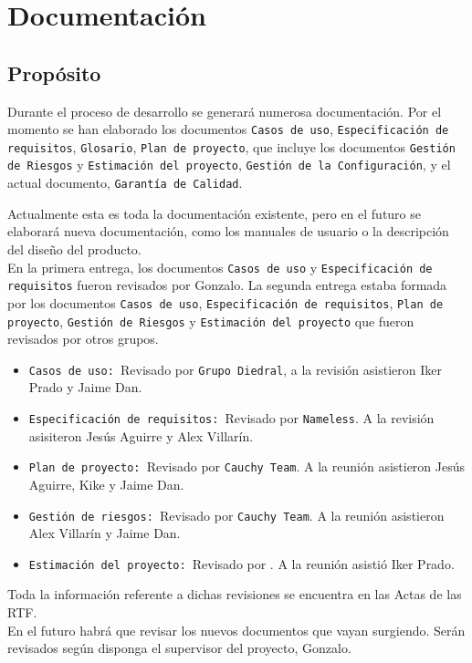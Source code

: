 \documentclass[spanish,a4paper,11pt, twoside]{report}	%
\begin{document}
\newpage
\mbox{}
\thispagestyle{empty}						%
\newpage

\chapter{ Documentación}%
	
	
	\section{Propósito}
			Durante el proceso de desarrollo se generará numerosa documentación.
		Por el momento se han elaborado los documentos \texttt{Casos de uso}, \texttt{Especificación de requisitos}, \texttt{Glosario}, \texttt{Plan de proyecto}, 
		que incluye los documentos \texttt{Gestión de Riesgos} y \texttt{Estimación del proyecto}, \texttt{Gestión de la Configuración}, 
		y el actual documento, \texttt{Garantía de Calidad}.

		Actualmente esta es toda la documentación existente, pero en el futuro se elaborará nueva documentación, 
		como los manuales de usuario o la descripción del diseño del producto.\\
			En la primera entrega, los documentos \texttt{Casos de uso} y \texttt{Especificación de requisitos} fueron revisados por Gonzalo. 
		La segunda entrega estaba formada por los documentos \texttt{Casos de uso}, \texttt{Especificación de requisitos}, \texttt{Plan de proyecto}, 
		\texttt{Gestión de Riesgos} y \texttt{Estimación del proyecto} que fueron revisados por otros grupos.
		 \begin{itemize}
		   \item \texttt{Casos de uso: }Revisado por \texttt{Grupo Diedral}, a la revisión asistieron Iker Prado y Jaime Dan.
		   \item \texttt{Especificación de requisitos: }Revisado por \texttt{Nameless}. A la revisión asisiteron Jesús Aguirre y Alex Villarín.
		   \item \texttt{Plan de proyecto: }Revisado por \texttt{Cauchy Team}. A la reunión asistieron Jesús Aguirre, Kike y Jaime Dan.
		   \item \texttt{Gestión de riesgos: }Revisado por \texttt{Cauchy Team}. A la reunión asistieron Alex Villarín y Jaime Dan.
		   \item \texttt{Estimación del proyecto: }Revisado por \texttt{}. A la reunión asistió Iker Prado.%
		 \end{itemize}
		 Toda la información referente a dichas revisiones se encuentra en las Actas de las RTF.\\
		 En el futuro habrá que revisar los nuevos documentos que vayan surgiendo. Serán revisados según disponga el supervisor del proyecto, Gonzalo.
		 
\end{document}
